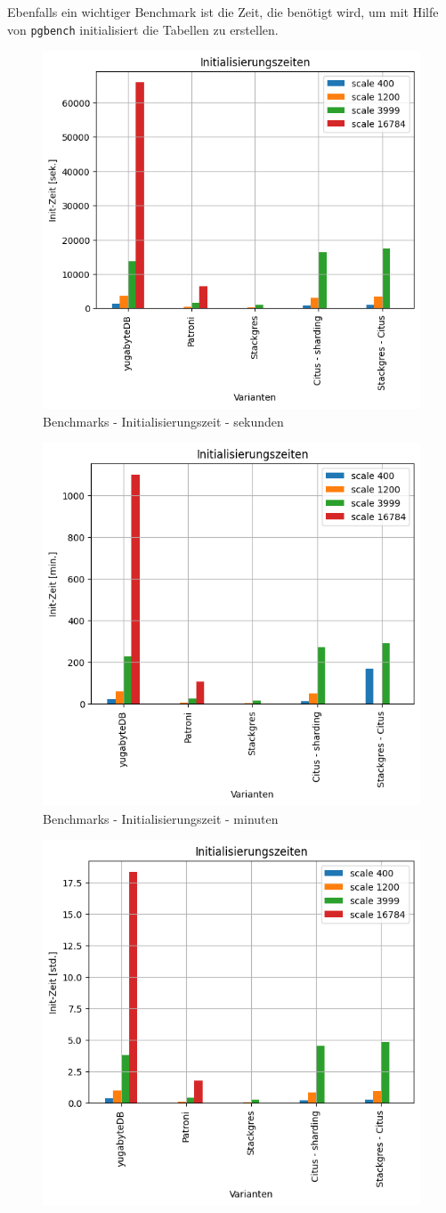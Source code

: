 \begin{flushleft}
    Ebenfalls ein wichtiger Benchmark ist die Zeit, die benötigt wird, um mit Hilfe von \texttt{pgbench} initialisiert die Tabellen zu erstellen.
    \begin{figure}[H]
        \centering
        \includegraphics[width=0.5\linewidth]{source/pandas_data_chart_plotter/initializing_time_sec}
        \caption{Benchmarks - Initialisierungszeit - sekunden}
        \label{fig:initializing_time_sec}
    \end{figure}
    \begin{figure}[H]
        \centering
        \includegraphics[width=0.5\linewidth]{source/pandas_data_chart_plotter/initializing_time_min}
        \caption{Benchmarks - Initialisierungszeit - minuten}
        \label{fig:initializing_time_min}
    \end{figure}
    \begin{figure}[H]
        \centering
        \includegraphics[width=0.5\linewidth]{source/pandas_data_chart_plotter/initializing_time_hour}

\end{figure}
\end{flushleft}

